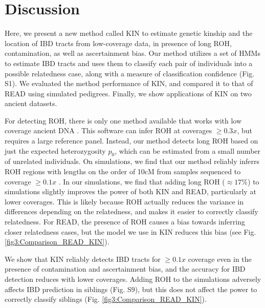 \documentclass[12pt, letterpaper]{article}
\begin{document}
\section{Discussion}\label{discussion}
Here, we present a new method called KIN to estimate genetic kinship and the location of IBD tracts from low-coverage data, in presence of long ROH, contamination, as well as ascertainment bias. Our method utilizes a set of HMMs to estimate IBD tracts and uses them to classify each pair of individuals into a possible relatedness case, along with a measure of classification confidence (Fig. S1). We evaluated the method performance of KIN, and compared it to that of READ using simulated pedigrees. Finally, we show applications of KIN on two ancient datasets.

For detecting ROH, there is only one method available that works with low coverage ancient DNA \cite{ringbauer_parental_2021}. This software can infer ROH at coverages $\geq0.3x$, but requires a large reference panel. Instead, our method detects long ROH based on just the expected heterozygosity $p_0$, which can be estimated from a small number of unrelated individuals.  On simulations, we find that our method reliably inferrs ROH regions  with lengths on the order of 10cM from samples sequenced to coverage $\geq 0.1x$ .
In our simulations, we find that adding long ROH ($\approx17\%$) to simulations slightly improves the power of both KIN and READ, particularly at lower coverages. This is likely because ROH actually reduces the variance in differences depending on the relatedness, and makes it easier to correctly classify relatedness. For READ, the presence of ROH causes a bias towards inferring closer relatedness cases, but the model we use in KIN reduces this bias (see Fig. \ref{fig3:Comparison_READ_KIN}).

We show that KIN reliably detects IBD tracts for $\geq0.1x$ coverage even in the presence of contamination and ascertainment bias, and the accuracy for IBD detection reduces with lower coverages. Adding ROH to the simulations adversely affects IBD prediction in siblings (Fig. S9), but this does not affect the power to correctly classify siblings (Fig. \ref{fig3:Comparison_READ_KIN}).
\end{document}
